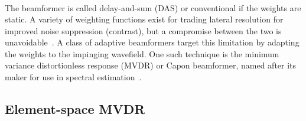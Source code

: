 {\begin{align}
\end{align}
%
%
%
%
%
The beamformer is called delay-and-sum (DAS) or conventional if the weights are static. A variety of weighting functions exist for trading lateral resolution for improved noise suppression (contrast), but a compromise between the two is unavoidable~\cite{Harris1978}. A class of adaptive beamformers target this limitation by adapting the weights to the impinging wavefield. One such technique is the minimum variance distortionless response (MVDR) or Capon beamformer, named after its maker for use in spectral estimation~\cite{Capon1969}.



\subsection{Element-space MVDR}

%



}
